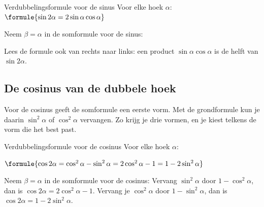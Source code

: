 \begin{theorie}
\begin{stelling}{Verdubbelingsformule voor de sinus}
Voor elke hoek $\alpha$: \quad $\formule{\sin 2\alpha = 2\sin\alpha\cos\alpha}$
\end{stelling}
\begin{bewijs}
Neem $\beta = \alpha$ in de somformule voor de sinus:
\end{bewijs}
\end{theorie}

Lees de formule ook van rechts naar links: een product $\sin\alpha\cos\alpha$ is de helft van $\sin 2\alpha$.


\begin{oefeningen}
\end{oefeningen}

\subsection{De cosinus van de dubbele hoek}

Voor de cosinus geeft de somformule een eerste vorm. Met de grondformule kun je daarin $\sin^2\alpha$ of $\cos^2\alpha$ vervangen. Zo krijg je drie vormen, en je kiest telkens de vorm die het best past.

\begin{theorie}
\begin{stelling}{Verdubbelingsformule voor de cosinus}
Voor elke hoek $\alpha$:

\vspace{1mm}
\qquad $\formule{\cos 2\alpha = \cos^2\alpha - \sin^2\alpha = 2\cos^2\alpha - 1 = 1 - 2\sin^2\alpha}$
\end{stelling}
\begin{bewijs}
Neem $\beta = \alpha$ in de somformule voor de cosinus:
Vervang $\sin^2\alpha$ door $1 - \cos^2\alpha$, dan is $\cos 2\alpha = 2\cos^2\alpha - 1$. Vervang je $\cos^2\alpha$ door $1 - \sin^2\alpha$, dan is $\cos 2\alpha = 1 - 2\sin^2\alpha$.
\end{bewijs}
\end{theorie}

